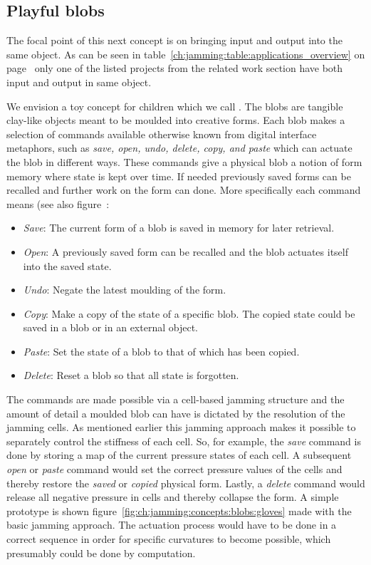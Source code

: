 \subsection{Playful blobs}
\label{ch:jamming:concepts:playful_blobs}

The focal point of this next concept is on bringing input and output into the same object.
As can be seen in table~\ref{ch:jamming:table:applications_overview} on page~\pageref{ch:jamming:table:applications_overview} only one of the listed projects from the related work section have both input and output in same object. 

We envision a toy concept for children which we call .
The blobs are tangible clay-like objects meant to be moulded into creative forms.
Each blob makes a selection of commands available otherwise known from digital interface metaphors, such as \emph{save, open, undo, delete, copy, and paste} which can actuate the blob in different ways.
These commands give a physical blob a notion of form memory where state is kept over time.
If needed previously saved forms can be recalled and further work on the form can done.
More specifically each command means (see also figure~:
\begin{itemize}
	\item{\emph{Save}: The current form of a blob is saved in memory for later retrieval.}
	\item{\emph{Open}: A previously saved form can be recalled and the blob actuates itself into the saved state.}
	\item{\emph{Undo}: Negate the latest moulding of the form.}
	\item{\emph{Copy}: Make a copy of the state of a specific blob. The copied state could be saved in a blob or in an external object.}
	\item{\emph{Paste}: Set the state of a blob to that of which has been copied.} 
	\item{\emph{Delete}: Reset a blob so that all state is forgotten.} 
\end{itemize}
The commands are made possible via a cell-based jamming structure and the amount of detail a moulded blob can have is dictated by the resolution of the jamming cells.
As mentioned earlier this jamming approach makes it possible to separately control the stiffness of each cell.
So, for example, the \emph{save} command is done by storing a map of the current pressure states of each cell.
A subsequent \emph{open} or \emph{paste} command would set the correct pressure values of the cells and thereby restore the \emph{saved} or \emph{copied} physical form.
Lastly, a \emph{delete} command would release all negative pressure in cells and thereby collapse the form.
A simple prototype is shown figure~\ref{fig:ch:jamming:concepts:blobs:gloves} made with the basic jamming approach.
The actuation process would have to be done in a correct sequence in order for specific curvatures to become possible, which presumably could be done by computation.

